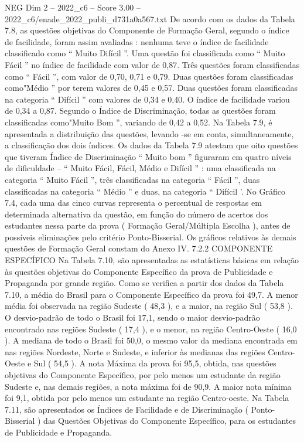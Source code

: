 \begin{textsample}{NEG Dim 2 – 2022\_c6 – Score 3.00 – 2022\_c6/enade\_2022\_publi\_d731a0a567.txt}
De acordo com os dados da Tabela 7.8, as questões objetivas do Componente de Formação Geral, segundo o índice de facilidade, foram assim avaliadas : nenhuma teve o índice de facilidade classificado como “ Muito Difícil ”.
Uma questão foi classificada como “ Muito Fácil ” no índice de facilidade com valor de 0,87.
Três questões foram classificadas como “ Fácil ”, com valor de 0,70, 0,71 e 0,79.
Duas questões foram classificadas como"Médio ” por terem valores de 0,45 e 0,57.
Duas questões foram classificadas na categoria “ Difícil ” com valores de 0,34 e 0,40.
O índice de facilidade variou de 0,34 a 0,87.
Segundo o Índice de Discriminação, todas as questões foram classificadas como"Muito Bom ”, variando de 0,42 a 0,52.
Na Tabela 7.9, é apresentada a distribuição das questões, levando -se em conta, simultaneamente, a classificação dos dois índices.
Os dados da Tabela 7.9 atestam que oito questões que tiveram Índice de Discriminação “ Muito bom ” figuraram em quatro níveis de dificuldade – “ Muito Fácil, Fácil, Médio e Difícil ” : uma classificada na categoria “ Muito Fácil ”, três classificadas na categoria “ Fácil ”, duas classificadas na categoria “ Médio ” e duas, na categoria “ Difícil ’.
No Gráfico 7.4, cada uma das cinco curvas representa o percentual de respostas em determinada alternativa da questão, em função do número de acertos dos estudantes nessa parte da prova ( Formação Geral/Múltipla Escolha ), antes de possíveis eliminações pelo critério Ponto-Bisserial.
Os gráficos relativos às demais questões de Formação Geral constam do Anexo IV. 7.2.2 COMPONENTE ESPECÍFICO Na Tabela 7.10, são apresentadas as estatísticas básicas em relação às questões objetivas do Componente Específico da prova de Publicidade e Propaganda por grande região.
Como se verifica a partir dos dados da Tabela 7.10, a média do Brasil para o Componente Específico da prova foi 49,7.
A menor média foi observada na região Sudeste ( 48,3 ), e a maior, na região Sul ( 53,8 ).
O desvio-padrão de todo o Brasil foi 17,1, sendo o maior desvio-padrão encontrado nas regiões Sudeste ( 17,4 ), e o menor, na região Centro-Oeste ( 16,0 ).
A mediana de todo o Brasil foi 50,0, o mesmo valor da mediana encontrada em nas regiões Nordeste, Norte e Sudeste, e inferior às medianas das regiões Centro-Oeste e Sul ( 54,5 ).
A nota Máxima da prova foi 95,5, obtida, nas questões objetivas do Componente Específico, por pelo menos um estudante da região Sudeste e, nas demais regiões, a nota máxima foi de 90,9.
A maior nota mínima foi 9,1, obtida por pelo menos um estudante na região Centro-oeste.
Na Tabela 7.11, são apresentados os Índices de Facilidade e de Discriminação ( Ponto-Bisserial ) das Questões Objetivas do Componente Específico, para os estudantes de Publicidade e Propaganda.

\end{textsample}
